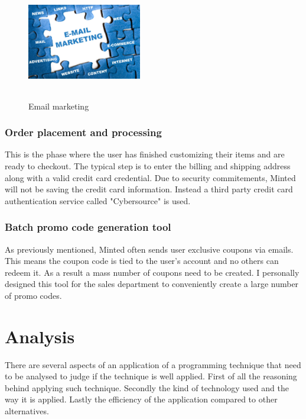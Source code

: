 \documentclass[12pt]{article}
\begin{document}
\begin{figure}[ht!]
\centering
\includegraphics[width=5cm,height=5cm,keepaspectratio]{img/email-marketing.jpg}
\caption{Email marketing}
\label{overflow}
\end{figure}

\subsubsection{Order placement and processing}
This is the phase where the user has finished customizing their items and are ready to checkout. The typical step is to enter the billing and shipping address along with a valid credit card credential. Due to security commitements, Minted will not be saving the credit card information. Instead a third party credit card authentication service called "Cybersource" is used.\\

\subsubsection{Batch promo code generation tool}
As previously mentioned, Minted often sends user exclusive coupons via emails. This means the coupon code is tied to the user's account and no others can redeem it. As a result a mass number of coupons need to be created. I personally designed this tool for the sales department to conveniently create a large number of promo codes.\\
\newpage

\section{Analysis}
There are several aspects of an application of a programming technique that need to be analysed to judge if the technique is well applied. First of all the reasoning behind applying such technique. Secondly the kind of technology used and the way it is applied. Lastly the efficiency of the application compared to other alternatives.\\
\end{document}
